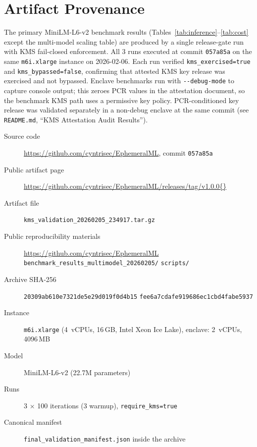 \documentclass[11pt,a4paper]{article}
\newcommand{\BenchInstance}{m6i.xlarge}
\newcommand{\BenchModelName}{MiniLM-L6-v2}
\newcommand{\BenchModelParams}{22.7M}
\newcommand{\BenchNumRuns}{3}
\newcommand{\BenchCommit}{057a85a}
\newcommand{\BenchArtifactReleasePage}{https://github.com/cyntrisec/EphemeralML/releases/tag/v1.0.0}
\begin{document}
\section*{Artifact Provenance}
\label{sec:provenance}

The primary MiniLM-L6-v2 benchmark results (Tables~\ref{tab:inference}--\ref{tab:cost} except the multi-model scaling table) are produced by a single release-gate run with KMS fail-closed enforcement.
All \BenchNumRuns{} runs executed at commit \texttt{\BenchCommit{}} on the same \texttt{\BenchInstance{}} instance on 2026-02-06.
Each run verified \texttt{kms\_exercised=true} and \texttt{kms\_bypassed=false}, confirming that attested KMS key release was exercised and not bypassed.
Enclave benchmarks run with \texttt{-{}-debug-mode} to capture console output; this zeroes PCR values in the attestation document, so the benchmark KMS path uses a permissive key policy.
PCR-conditioned key release was validated separately in a non-debug enclave at the same commit (see \texttt{README.md}, ``KMS Attestation Audit Results'').

\begin{description}
  \item[Source code] \url{https://github.com/cyntrisec/EphemeralML}, commit \texttt{\BenchCommit{}}
  \item[Public artifact page]
  \url{\BenchArtifactReleasePage{}}
  \item[Artifact file]
  \texttt{kms\_validation\_20260205\_234917.tar.gz}
  \item[Public reproducibility materials]
  \url{https://github.com/cyntrisec/EphemeralML}
  \newline
  \texttt{benchmark\_results\_multimodel\_20260205/}
  \newline
  \texttt{scripts/}
  \item[Archive SHA-256]
  \texttt{20309ab610e7321de5e29d019f0d4b15}
  \newline
  \texttt{fee6a7cdafe919686ec1cbd4fabe5937}
  \item[Instance] \texttt{\BenchInstance{}} (4~vCPUs, 16\,GB, Intel Xeon Ice Lake), enclave: 2~vCPUs, 4096\,MB
  \item[Model] \BenchModelName{} (\BenchModelParams{} parameters)
  \item[Runs] \BenchNumRuns{} $\times$ 100 iterations (3 warmup), \texttt{require\_kms=true}
  \item[Canonical manifest] \texttt{final\_validation\_manifest.json} inside the archive
\end{description}
\end{document}
